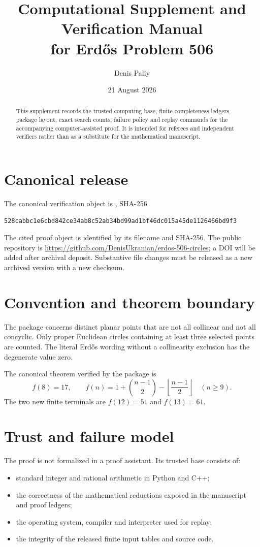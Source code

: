 \documentclass[11pt]{article}
\title{Computational Supplement and Verification Manual\\for Erd\H{o}s Problem 506}
\author{Denis Paliy}
\date{21 August 2026}
\begin{document}
\maketitle

\begin{abstract}
This supplement records the trusted computing base, finite completeness ledgers, package layout, exact search counts, failure policy and replay commands for the accompanying computer-assisted proof.  It is intended for referees and independent verifiers rather than as a substitute for the mathematical manuscript.
\end{abstract}

\section{Canonical release}

The canonical verification object is , SHA-256
\begin{verbatim}
528cabbc1e6cbd842ce34ab8c52ab34bd99ad1bf46dc015a45de1126466bd9f3
\end{verbatim}
The cited proof object is identified by its filename and SHA-256.  The public repository is \url{https://github.com/DenisUkranian/erdos-506-circles}; a DOI will be added after archival deposit.  Substantive file changes must be released as a new archived version with a new checksum.

\section{Convention and theorem boundary}

The package concerns distinct planar points that are not all collinear and not all concyclic.  Only proper Euclidean circles containing at least three selected points are counted.  The literal Erd\H{o}s wording without a collinearity exclusion has the degenerate value zero.

The canonical theorem verified by the package is
\[
 f(8)=17,
 \qquad
 f(n)=1+\binom{n-1}{2}-\left\lfloor\frac{n-1}{2}\right\rfloor
 \quad(n\ge9).
\]
The two new finite terminals are $f(12)=51$ and $f(13)=61$.

\section{Trust and failure model}

The proof is not formalized in a proof assistant.  Its trusted base consists of:
\begin{itemize}
\item standard integer and rational arithmetic in Python and C++;
\item the correctness of the mathematical reductions exposed in the manuscript and proof ledgers;
\item the operating system, compiler and interpreter used for replay;
\item the integrity of the released finite input tables and source code.
\end{itemize}
\end{document}
